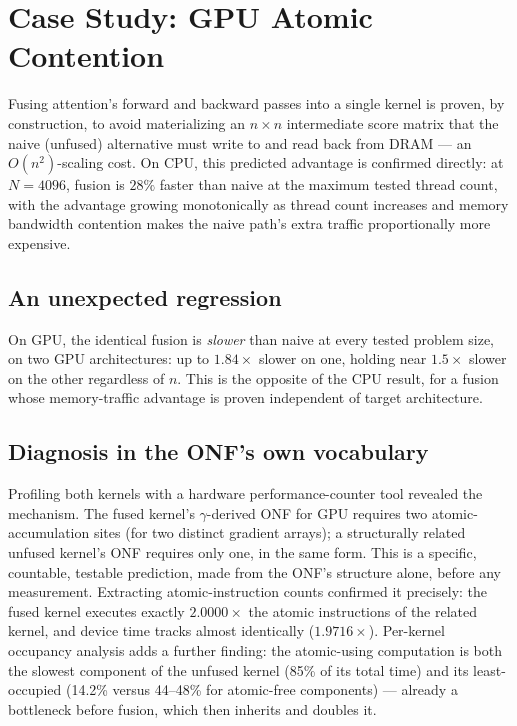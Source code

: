 \documentclass[conference]{IEEEtran}
\begin{document}
\section{Case Study: GPU Atomic Contention}
\label{sec:atomic}

Fusing attention's forward and backward passes into a single kernel is
proven, by construction, to avoid materializing an $n\times n$
intermediate score matrix that the naive (unfused) alternative must
write to and read back from DRAM --- an $O(n^2)$-scaling cost. On CPU,
this predicted advantage is confirmed directly: at $N=4096$, fusion is
$28\%$ faster than naive at the maximum tested thread count, with the
advantage growing monotonically as thread count increases and memory
bandwidth contention makes the naive path's extra traffic
proportionally more expensive.

\subsection{An unexpected regression}

On GPU, the identical fusion is \emph{slower} than naive at every
tested problem size, on two GPU architectures: up to $1.84\times$
slower on one, holding near $1.5\times$ slower on the other regardless
of $n$. This is the opposite of the CPU result, for a fusion whose
memory-traffic advantage is proven independent of target architecture.

\subsection{Diagnosis in the ONF's own vocabulary}

Profiling both kernels with a hardware performance-counter tool
revealed the mechanism. The fused kernel's $\gamma$-derived ONF for
GPU requires two atomic-accumulation sites (for two distinct gradient
arrays); a structurally related unfused kernel's ONF requires only
one, in the same form. This is a specific, countable, testable
prediction, made from the ONF's structure alone, before any
measurement. Extracting atomic-instruction counts confirmed it
precisely: the fused kernel executes exactly $2.0000\times$ the
atomic instructions of the related kernel, and device time tracks
almost identically ($1.9716\times$). Per-kernel occupancy analysis
adds a further finding: the atomic-using computation is both the
slowest component of the unfused kernel (85\% of its total time) and
its least-occupied (14.2\% versus 44--48\% for atomic-free components)
--- already a bottleneck before fusion, which then inherits and
doubles it.
\end{document}
